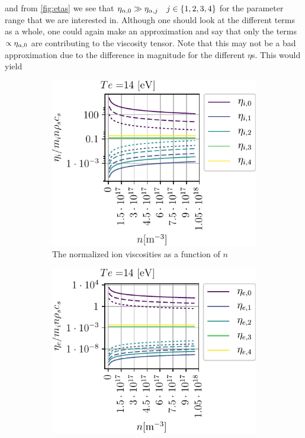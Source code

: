 %
and from \cref{fig:etas} we see that $\eta_{\alpha,0} \gg \eta_{\alpha,j} \quad j \in \{1,2,3,4\}$ for the parameter range that we are interested in.
Although one should look at the different terms as a whole, one could again make an approximation and say that only the terms $\propto \eta_{\alpha,0}$ are contributing to the viscosity tensor.
Note that this may not be a bad approximation due to the difference in magnitude for the different $\eta$s.
This would yield
%
\begin{figure}[t!]
    \centering
    \begin{subfigure}[t]{0.45\textwidth}
        \centering
        \includegraphics{fig/etaINScan}
        \caption{The normalized ion viscosities as a function of $n$}
    \end{subfigure}%
    \hfill
    \begin{subfigure}[t]{0.45\textwidth}
        \centering
        \includegraphics{fig/etaENScan}

\end{subfigure}
\end{figure}
